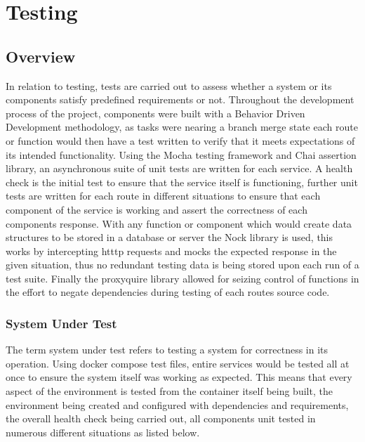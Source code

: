 \section{Testing}
	\subsection{Overview}
    In relation to testing, tests are carried out to assess whether a system or its components satisfy predefined requirements or not. Throughout the development process of the project, components were built with a Behavior Driven Development methodology, as tasks were nearing a branch merge state each route or function would then have a test written to verify that it meets expectations of its intended functionality. Using the Mocha testing framework and Chai assertion library, an asynchronous suite of unit tests are written for each service. A health check is the initial test to ensure that the service itself is functioning, further unit tests are written for each route in different situations to ensure that each component of the service is working and assert the correctness of each components response. With any function or component which would create data structures to be stored in a database or server the Nock library is used, this works by intercepting htttp requests and mocks the expected response in the given situation, thus no redundant testing data is being stored upon each run of a test suite. Finally the proxyquire library allowed for seizing control of functions in the effort to negate dependencies during testing of each routes source code.
    \subsubsection{System Under Test}
    The term system under test refers to testing a system for correctness in its operation. Using docker compose test files, entire services would be tested all at once to ensure the system itself was working as expected. This means that every aspect of the environment is tested from the container itself being built, the environment being created and configured with dependencies and requirements, the overall health check being carried out, all components unit tested in numerous different situations as listed below.
    
